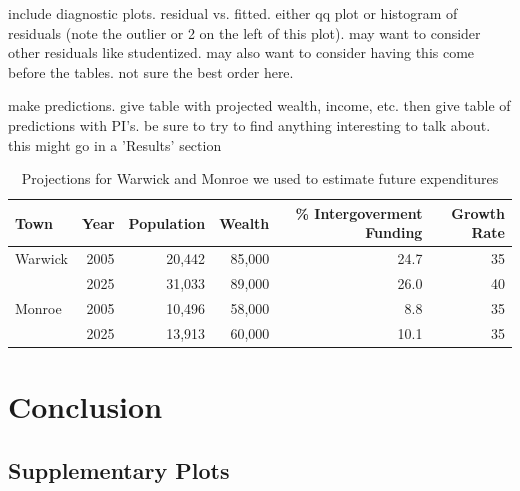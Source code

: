 \documentclass{article}\usepackage[]{graphicx}\usepackage[]{color}
\begin{document}
include diagnostic plots. residual vs. fitted. either qq plot or histogram of residuals (note the outlier or 2 on the left of this plot). may want to consider other residuals like studentized. may also want to consider having this come before the tables. not sure the best order here.

make predictions. give table with projected wealth, income, etc. then give table of predictions with PI's. be sure to try to find anything interesting to talk about. this might go in a 'Results' section

\begin{table}
\centering
\begin{tabular}{|l|rrrrr|}
\hline
Town & Year & Population & Wealth & \% Intergoverment Funding  & Growth Rate \\
\hline
Warwick & 2005 & 20,442 & 85,000 & 24.7 & 35 \\
        & 2025 & 31,033 & 89,000 & 26.0 & 40 \\
\hline
Monroe & 2005 & 10,496 & 58,000 & 8.8 & 35 \\
       & 2025 & 13,913 & 60,000 & 10.1 & 35 \\
\hline
\end{tabular}
\caption{Projections for Warwick and Monroe we used to estimate future expenditures}
\label{tab:projections}
\end{table}

\section{Conclusion} \label{conclusion}



\newpage
\begin{appendices}

\section{Supplementary Plots} \label{appendix_plots}

\end{appendices}
\end{document}
